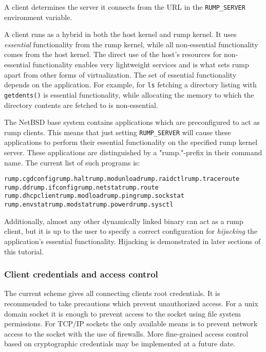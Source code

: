 A client determines the server it connects from the URL
in the \verb+RUMP_SERVER+ environment variable.

A client runs as a hybrid in both the host kernel and rump kernel.
It uses \emph{essential} functionality from the rump
kernel, while all non-essential functionality comes from the host
kernel.
The direct use of the
host's resources for non-essential functionality enables very
lightweight services and is what sets rump apart from other forms
of virtualization.
The set of essential functionality depends on the
application.  For example, for \verb+ls+ fetching a
directory listing with \verb+getdents()+ is essential
functionality, while allocating the memory to which the directory
contents are fetched to is non-essential.

The NetBSD base system contains applications which are preconfigured to
act as rump clients.  This means that just setting
\verb+RUMP_SERVER+ will cause these applications to perform
their essential functionality on the specified rump kernel server.
These applications are distinguished by a "rump."-prefix in their
command name.  The current list of such programs is:

{\footnotesize
\begin{alltt}
rump.cgdconfig  rump.halt       rump.modunload  rump.raidctl    rump.traceroute
rump.dd         rump.ifconfig   rump.netstat    rump.route      
rump.dhcpclient rump.modload    rump.ping       rump.sockstat   
rump.envstat    rump.modstat    rump.powerd     rump.sysctl     
\end{alltt}}

Additionally, almost any other dynamically linked binary can act
as a rump client, but it is up to the user to specify a correct
configuration for \emph{hijacking} the application's
essential functionality.  Hijacking is demonstrated in later sections
of this tutorial.

\subsubsection{Client credentials and access control}

The current scheme gives all connecting clients root credentials.  It is
recommended to take precautions which prevent unauthorized access.  For a
unix domain socket it is enough to prevent access to the socket using
file system permissions.  For TCP/IP sockets the only available means is
to prevent network access to the socket with the use of firewalls.  More
fine-grained access control based on cryptographic credentials may be
implemented at a future date.

